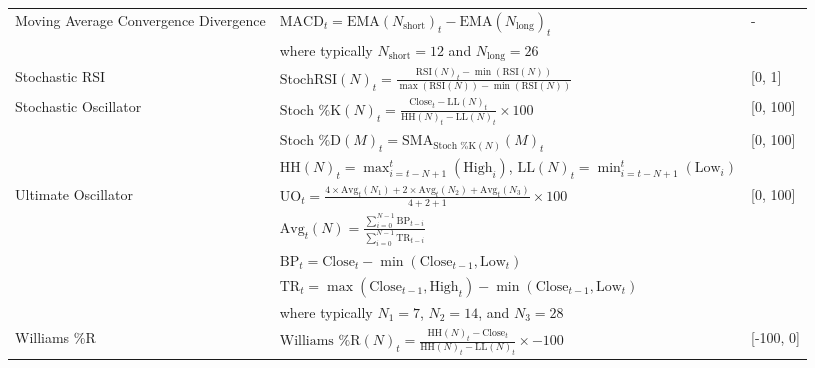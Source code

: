 \begin{table}[htb!]
\begin{tabularx}{\textwidth}{@{}lXl@{}}
\addlinespace
Moving Average Convergence Divergence & $\text{MACD}_t = \text{EMA}(N_{\text{short}})_t - \text{EMA}(N_{\text{long}})_t $ & - \\
\addlinespace
& where typically $N_{\text{short}} = 12$ and $N_{\text{long}} = 26$ & \\
\addlinespace
Stochastic RSI & $\text{StochRSI}(N)_t = \frac{\text{RSI}(N)_t - \min(\text{RSI}(N))}{\max(\text{RSI}(N)) - \min(\text{RSI}(N))}$ & [0, 1] \\
\addlinespace
Stochastic Oscillator & $\text{Stoch \%K}(N)_t = \frac{\text{Close}_t - \text{LL}(N)_t}{\text{HH}(N)_t - \text{LL}(N)_t} \times 100$ & [0, 100] \\
\addlinespace
& $\text{Stoch \%D}(M)_t = \text{SMA}_{\text{Stoch \%K}(N)}(M)_t$ & [0, 100] \\
\addlinespace
& $\text{HH}(N)_t = \max_{i=t-N+1}^{t}(\text{High}_i)$, $\text{LL}(N)_t = \min_{i=t-N+1}^{t}(\text{Low}_i)$ & \\
\addlinespace
Ultimate Oscillator & $\text{UO}_t = \frac{4 \times \text{Avg}_t(N_1) + 2 \times \text{Avg}_t(N_2) + \text{Avg}_t(N_3)}{4+2+1} \times 100$ & [0, 100] \\
\addlinespace
& $\text{Avg}_t(N) = \frac{\sum_{i=0}^{N-1}\text{BP}_{t-i}}{\sum_{i=0}^{N-1}\text{TR}_{t-i}}$ & \\
\addlinespace
& $\text{BP}_t = \text{Close}_t - \min(\text{Close}_{t-1}, \text{Low}_t)$ & \\
\addlinespace
& $\text{TR}_t = \max(\text{Close}_{t-1}, \text{High}_t) - \min(\text{Close}_{t-1}, \text{Low}_t)$ & \\
\addlinespace
& where typically $N_1 = 7$, $N_2 = 14$, and $N_3 = 28$ & \\
\addlinespace
Williams \%R & $\text{Williams \%R}(N)_t = \frac{\text{HH}(N)_t - \text{Close}_t}{\text{HH}(N)_t - \text{LL}(N)_t} \times -100$ & [-100, 0] \\
\bottomrule
\end{tabularx}
\end{table}